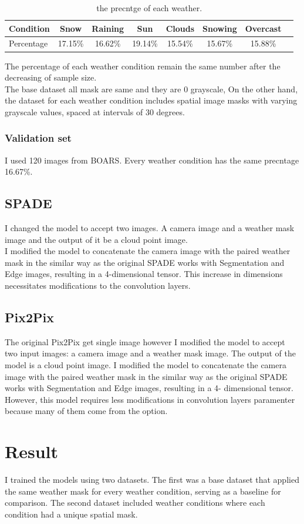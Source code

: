 \begin{table}[h]
    \centering
    \begin{tabular}{|l|c|c|c|c|c|c|c|}
        \hline
        Condition  & Snow    & Raining & Sun     & Clouds  & Snowing & Overcast \\
        \hline
        Percentage & 17.15\% & 16.62\% & 19.14\% & 15.54\% & 15.67\% & 15.88\%  \\
        \hline
    \end{tabular}
    \caption{the precntge of each weather.}
\end{table}
The percentage of each weather condition remain the same number after the decreasing of sample size.
\\
The base dataset all mask are same and they are 0 grayscale, On the other hand, the dataset for each weather condition includes spatial image masks with varying grayscale values, spaced at intervals of 30 degrees.
\subsubsection{Validation set}
I used 120 images from BOARS. Every weather condition has the same precntage 16.67\%.
\subsection{SPADE}
I changed the model to accept two images. A camera image and a weather mask image and the output of it be a cloud point image.
\\
I modified the model to concatenate the camera image with the paired weather mask in the similar way as the original SPADE works with Segmentation and Edge images, resulting in a 4-dimensional tensor.
This increase in dimensions necessitates modifications to the convolution layers.
\subsection{Pix2Pix}
The original Pix2Pix get single image however I modified the model to accept two input images: a camera image and a weather mask image. The output of the model is a cloud point image.
I modified the model to concatenate the camera image with the paired weather mask in the
similar way as the original SPADE works with Segmentation and Edge images, resulting in a 4-
dimensional tensor. However, this model requires less modifications in convolution layers paramenter because many of them come from the option.

\section{Result}
I trained the models using two datasets. The first was a base dataset that applied the same weather mask for every weather condition, serving as a baseline for comparison. The second dataset included weather conditions where each condition had a unique spatial mask.

